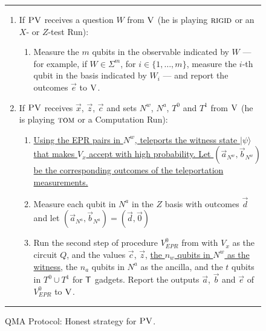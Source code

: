 \documentclass{toc}
\newcommand{\ket}[1]{|#1\rangle}
\newcommand{\rigid}{\textsc{rigid}}
\newcommand{\tom}{\textsc{tom}}
\newcommand{\ver}{\textsc{V}}
\newcommand{\pv}{\textsc{PV}}
\newcommand{\highlight}[1]{\uline{#1}}
\begin{document}
\begin{figure}[H]
\rule[1ex]{\textwidth}{0.5pt}
\vspace{-20pt}
\begin{enumerate}
  \item If $\pv$ receives a question ${W}$ from $\ver$ (he is playing $\rigid$ or an $X$- or $Z$-test Run):
\begin{enumerate}
     \item[]  Measure the $m$ qubits in the observable indicated by $W$ --- for example, if $W\in \Sigma^m$, for $i\in \{1,\ldots,m\}$, measure the $i$-th qubit in the basis indicated by $W_i$ --- and report the outcomes $\vec{e}$ to $\ver$.
\end{enumerate}

  \item If $\pv$ receives $\vec{x}$, $\vec{z}$, $\vec{c}$ and sets $N^w$, $N^a$, $T^0$ and $T^1$ from $\ver$ (he is playing $\tom$ or a Computation Run):
\begin{enumerate}
  \item[] \highlight{Using the EPR pairs in $N^w$, teleports the witness state
    $\ket{\psi}$ that makes $V_x$ accept with high probability. Let $(\vec{a}_{N^w}, \vec{b}_{N^w})$ be the corresponding
    outcomes of the teleportation measurements.}
  \item[] Measure each qubit in $N^a$ in the $Z$ basis with outcomes $\vec{d}$  and let $(\vec{a}_{N^a},
    \vec{b}_{N^a}) = (\vec{d}, \vec{0} )$ 
	\item[] Run the second step of procedure $V_{EPR}^0$ from
 with $V_x$ as the circuit $Q$, and
the
    values $\vec{c}$, $\vec{z}$, \highlight{the $n_w$ qubits in $N^w$ as the witness}, the $n_a$ qubits in 
        $N^a$ as the ancilla, and the $t$ qubits in $T^0\cup T^1$ for $\sf T$ gadgets. Report the outputs  $\vec{a}$, $\vec{b}$ and $\vec{e}$ of $V_{EPR}^0$ to $\ver$.
\end{enumerate}
\end{enumerate}
\rule[2ex]{\textwidth}{0.5pt}\vspace{-.5cm}
\caption{QMA Protocol: Honest strategy for $\pv$.}\label{fig:qma-protocol-PV}
\end{figure}
\end{document}
